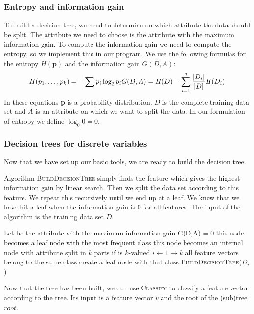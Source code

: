 \documentclass[10pt,a4paper]{article}
\begin{document}
\subsubsection{Entropy and information gain}
To build a decision tree, we need to determine on which attribute the data should be split. The attribute we need to choose is the attribute with the maximum information gain. To compute the information gain we need to compute the entropy, so we implement this in our program. We use the following formulas for the entropy $H(\textbf{p})$ and the information gain $G(D,A)$:
\begin{equation*}
H(p_1, \dots, p_k) = -\sum p_i\log_2p_i\\
G(D,A) = H(D) - \sum_{i=1}^n \frac{|D_i|}{|D|} H(D_i)
\end{equation*}
In these equations \textbf{p} is a probability distribution, $D$ is the complete training data set and $A$ is an attribute on which we want to split the data. In our formulation of entropy we define $\log_0 0 = 0$.
\subsubsection{Decision trees for discrete variables}
Now that we have set up our basic tools, we are ready to build the decision tree. 

Algorithm \textsc{BuildDecisionTree} simply finds the feature which gives the highest information gain by linear search. Then we split the data set according to this feature. We repeat this recursively until we end up at a leaf. We know that we have hit a leaf when the information gain is 0 for all features. The input of the algorithm is the training data set $D$. 

\begin{codebox}
\li Let  be the attribute with the maximum information gain
\li \If G(D,A) = 0 \Then
\li this node becomes a leaf node with the most frequent class 
\li	\Else
	this node becomes an internal node with attribute 
\li split  in $k$ parts  if  is $k$-valued
\li \For $i \gets 1 \to k$ \Do
\li 	\If all feature vectors belong to the same class \Then
\li	create a leaf node with that class
\li	\Else
	\textsc{BuildDecisionTree($D_i$)}
	\End
	\End
\End
\end{codebox}

Now that the tree has been built, we can use \textsc{Classify} to classify a feature vector according to the tree. Its input is a feature vector $v$ and the root of the (sub)tree $root$.
\end{document}
